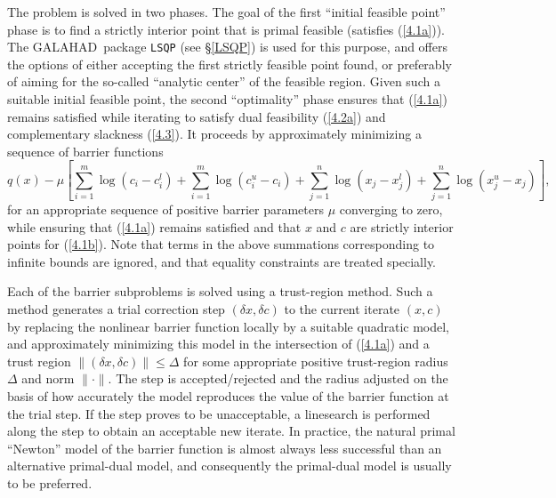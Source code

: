 \documentclass[acmtocl,acmnow]{acmtrans2m}
\newcommand{\req}[1]{(\ref{#1})}
\newcommand{\gal}{{\sf GALAHAD}}
\newcommand{\disp}[1]{\[{#1}\]}
\begin{document}
The problem is solved in two phases. The goal of the first
``initial feasible point'' phase is
to find a strictly interior point that is primal feasible (satisfies
\req{4.1a}). The \gal\ package {\tt LSQP} (see \S\ref{LSQP})
is used for this purpose, and offers the options of either accepting the first
strictly feasible point found, or preferably of aiming for the
so-called ``analytic center'' of the feasible region.
Given such a suitable initial feasible point, the second ``optimality''
phase ensures that \req{4.1a} remains satisfied while iterating to
satisfy dual feasibility \req{4.2a} and complementary slackness \req{4.3}.
It proceeds by approximately minimizing a
sequence of barrier functions
\disp{q(x) - \mu \left[ \sum_{i=1}^{m} \log ( c_{i}  -  c_{i}^{l} )
 + \sum_{i=1}^{m} \log ( c_{i}^{u}  -  c_{i} )
 + \sum_{j=1}^{n} \log ( x_{j}  -  x_{j}^{l} )
 + \sum_{j=1}^{n} \log ( x_{j}^{u}  -  x_{j} ) \right] ,}
for an appropriate sequence of positive barrier parameters $\mu$
converging to zero,
while ensuring that \req{4.1a} remains satisfied and that
$x$ and $c$ are strictly interior points for \req{4.1b}.
Note that terms in the above summations corresponding to infinite bounds are
ignored, and that equality constraints are treated specially.

Each of the barrier subproblems is solved using a trust-region method.
Such a method generates a trial correction step $(\delta x, \delta c)$
to the current iterate $(x, c)$
by replacing the nonlinear barrier function locally by a suitable
quadratic model, and approximately minimizing this model in the
intersection of \req{4.1a}
and a trust region $\|( \delta x,  \delta c)\| \leq \Delta$
for some appropriate
positive trust-region radius $\Delta$ and norm $\| \cdot \|$.
The step is accepted/rejected
and the radius adjusted on the basis of how accurately the model reproduces the
value of the barrier function at the trial step. If the step proves to be
unacceptable, a linesearch is performed along the step to obtain an acceptable
new iterate. In practice, the natural primal ``Newton'' model of the barrier
function is almost always
less successful than an alternative primal-dual model,
and consequently the primal-dual model is usually to be preferred.
\end{document}
